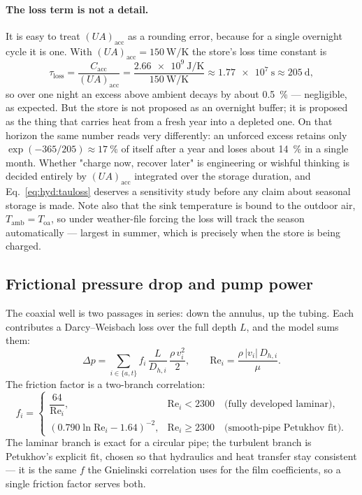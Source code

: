 \documentclass[11pt]{article}
\newcommand{\UA}{\ensuremath{U\!A}}
\begin{document}
\paragraph{The loss term is not a detail.} It is easy to treat $(\UA)_{\mathrm{acc}}$ as a
rounding error, because for a single overnight cycle it is one. With
$(\UA)_{\mathrm{acc}}=\SI{150}{\watt\per\kelvin}$ the store's loss time constant is
\begin{equation}
\tau_{\mathrm{loss}}=\frac{C_{\mathrm{acc}}}{(\UA)_{\mathrm{acc}}}
=\frac{\SI{2.66e9}{\joule\per\kelvin}}{\SI{150}{\watt\per\kelvin}}
\approx\SI{1.77e7}{\second}\approx\SI{205}{\day},
\label{eq:hyd:tauloss}
\end{equation}
so over one night an excess above ambient decays by about \SI{0.5}{\percent} --- negligible, as
expected. But the store is not proposed as an overnight buffer; it is proposed as the thing
that carries heat from a fresh year into a depleted one. On that horizon the same number reads
very differently: an unforced excess retains only $\exp(-365/205)\approx\SI{17}{\percent}$ of
itself after a year and loses about \SI{14}{\percent} in a single month. Whether "charge now,
recover later" is engineering or wishful thinking is decided entirely by $(\UA)_{\mathrm{acc}}$
integrated over the storage duration, and Eq.~\eqref{eq:hyd:tauloss} deserves a sensitivity
study before any claim about seasonal storage is made. Note also that the sink temperature is
bound to the outdoor air, $T_{\mathrm{amb}}=T_{\mathrm{oa}}$, so under weather-file forcing the
loss will track the season automatically --- largest in summer, which is precisely when the
store is being charged.

\subsection{Frictional pressure drop and pump power}
\label{sec:hyd:pump}

The coaxial well is two passages in series: down the annulus, up the tubing. Each contributes a
Darcy--Weisbach loss over the full depth $L$, and the model sums them:
\begin{equation}
\Delta p=\sum_{i\in\{a,t\}}f_i\,\frac{L}{D_{h,i}}\,
\frac{\rho\,v_i^{2}}{2},
\qquad
\mathrm{Re}_i=\frac{\rho\,|v_i|\,D_{h,i}}{\mu} .
\label{eq:hyd:dp}
\end{equation}
The friction factor is a two-branch correlation:
\begin{equation}
f_i=
\begin{cases}
\dfrac{64}{\mathrm{Re}_i}, & \mathrm{Re}_i<2300 \quad\text{(fully developed laminar)},\\[10pt]
\left(0.790\ln \mathrm{Re}_i-1.64\right)^{-2}, & \mathrm{Re}_i\ge2300
\quad\text{(smooth-pipe Petukhov fit)} .
\end{cases}
\label{eq:hyd:friction}
\end{equation}
The laminar branch is exact for a circular pipe; the turbulent branch is Petukhov's explicit
fit, chosen so that hydraulics and heat transfer stay consistent --- it is the same $f$ the
Gnielinski correlation uses for the film coefficients, so a single friction factor serves both.
\end{document}
